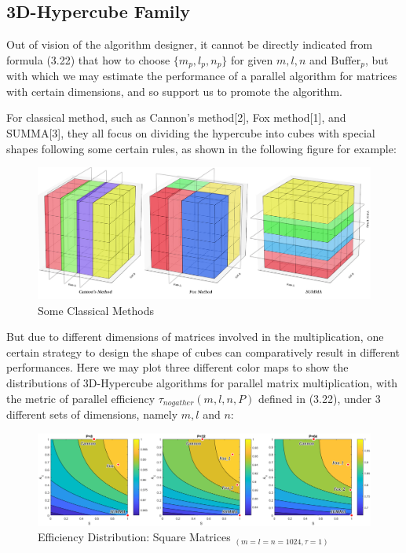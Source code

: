 \documentclass{amsart}
\theoremstyle{definition}
\theoremstyle{remark}
\numberwithin{equation}{section}
\begin{document}
\subsection{3D-Hypercube Family}
Out of vision of the algorithm designer, it cannot be directly indicated from formula (3.22) that how to choose $\{m_p,l_p,n_p\}$ for given $m,l,n$ and $\text{Buffer}_p$, but with which we may estimate the performance of a parallel algorithm for matrices with certain dimensions, and so support us to promote the algorithm.\par
For classical method, such as Cannon’s method[2], Fox method[1], and SUMMA[3], they all focus on dividing the hypercube into cubes with special shapes following some certain rules, as shown in the following figure for example:
\begin{figure}[h]
	\includegraphics[scale=0.18]{Figures/3DAlg.jpg}
	\caption{Some Classical Methods}
\end{figure}
\par
	But due to different dimensions of matrices involved in the multiplication, one certain strategy to design the shape of cubes can comparatively result in different performances. Here we may plot three different color maps to show the distributions of 3D-Hypercube algorithms for parallel matrix multiplication, with the metric of parallel efficiency $\tau_{no gather}(m,l,n,P)$ defined in (3.22), under 3 different sets of dimensions, namely $m,l$ and $n$:
\begin{figure}[h]
	\includegraphics[scale=0.32]{Figures/Regular.png}
	\caption{Efficiency Distribution: Square Matrices $_{(m=l=n=1024,\tau=1)}$}
\end{figure}
\end{document}
